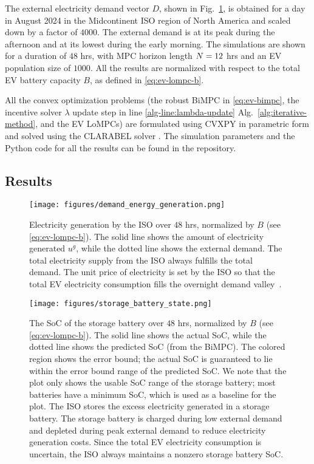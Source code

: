 The external electricity demand vector $D$, shown in Fig.~\ref{fig:ev-demand-electricity-generation}, is obtained for a day in August 2024 in the Midcontinent ISO region of North America and scaled down by a factor of $4000$.
The external demand is at its peak during the afternoon and at its lowest during the early morning.
The simulations are shown for a duration of $48$ hrs, with MPC horizon length $N = 12$ hrs and an EV population size of $1000$.
All the results are normalized with respect to the total EV battery capacity $B$, as defined in \eqref{eq:ev-lompc-b}.

All the convex optimization problems (the robust BiMPC in \eqref{eq:ev-bimpc}, the incentive solver $\lambda$ update step in line \ref{alg-line:lambda-update} Alg.~\ref{alg:iterative-method}, and the EV LoMPCs) are formulated using CVXPY \cite{diamond2016cvxpy} in parametric form and solved using the CLARABEL solver \cite{goulart2024clarabel}.
The simulation parameters and the Python code for all the results can be found in the repository.


\subsection{Results}
\label{subsec:ev-results}

\begin{figure}%
    \centering
    \texttt{[image: figures/demand\_energy\_generation.png]}
    \caption{Electricity generation by the ISO over $48$ hrs, normalized by $B$ (see \eqref{eq:ev-lompc-b}).
    The solid line shows the amount of electricity generated $u^g$, while the dotted line shows the external demand.
    The total electricity supply from the ISO always fulfills the total demand.
    The unit price of electricity is set by the ISO so that the total EV electricity consumption fills the overnight demand valley~\cite{ma2013decentralized,zou2017efficient}.
    }
    \label{fig:ev-demand-electricity-generation}
\end{figure}

\begin{figure}%
    \centering
    \texttt{[image: figures/storage\_battery\_state.png]}
    \caption{The SoC of the storage battery over $48$ hrs, normalized by $B$ (see \eqref{eq:ev-lompc-b}).
    The solid line shows the actual SoC, while the dotted line shows the predicted SoC (from the BiMPC).
    The colored region shows the error bound; the actual SoC is guaranteed to lie within the error bound range of the predicted SoC.
    We note that the plot only shows the usable SoC range of the storage battery; most batteries have a minimum SoC, which is used as a baseline for the plot.
    The ISO stores the excess electricity generated in a storage battery.
    The storage battery is charged during low external demand and depleted during peak external demand to reduce electricity generation costs.
    Since the total EV electricity consumption is uncertain, the ISO always maintains a nonzero storage battery SoC.
    }
    \label{fig:ev-storage-battery-state}
\end{figure}


